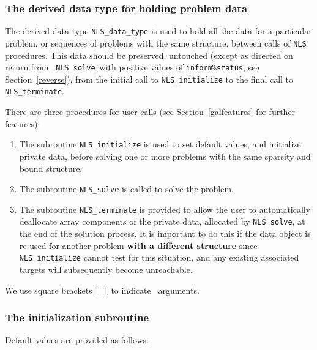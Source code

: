 \documentclass{galahad}
\newcommand{\packagename}{NLS}
\newcommand{\fullpackagename}{\libraryname\_\packagename}
\newcommand{\solver}{{\tt \fullpackagename\_solve}}
\begin{document}

\subsubsection{The derived data type for holding problem data}\label{typedata}
The derived data type
{\tt \packagename\_data\_type}
is used to hold all the data for a particular problem,
or sequences of problems with the same structure, between calls of
{\tt \packagename} procedures.
This data should be preserved, untouched (except as directed on
return from \solver\ with positive values of {\tt inform\%status}, see
Section~\ref{reverse}),
from the initial call to
{\tt \packagename\_initialize}
to the final call to
{\tt \packagename\_terminate}.





\galarguments
There are three procedures for user calls
(see Section~\ref{galfeatures} for further features):

\begin{enumerate}
\item The subroutine
      {\tt \packagename\_initialize}
      is used to set default values, and initialize private data,
      before solving one or more problems with the
      same sparsity and bound structure.
\item The subroutine
      {\tt \packagename\_solve}
      is called to solve the problem.
\item The subroutine
      {\tt \packagename\_terminate}
      is provided to allow the user to automatically deallocate array
       components of the private data, allocated by
       {\tt \packagename\_solve},
       at the end of the solution process.
       It is important to do this if the data object is re-used for another
       problem {\bf with a different structure}
       since {\tt \packagename\_initialize} cannot test for this situation,
       and any existing associated targets will subsequently become unreachable.
\end{enumerate}
We use square brackets {\tt [ ]} to indicate \optional\ arguments.


\subsubsection{The initialization subroutine}\label{subinit}
 Default values are provided as follows:
\vspace*{1mm}
\end{document}
